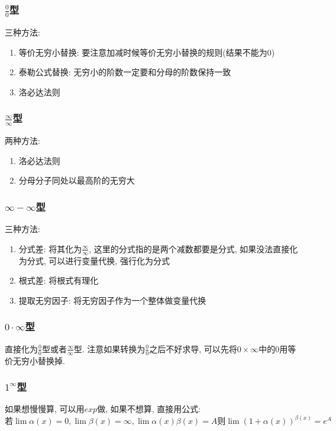 \subsubsection{$ \frac{0}{0} $型}
三种方法:
\begin{enumerate}
    \item 等价无穷小替换: 要注意加减时候等价无穷小替换的规则(结果不能为$ 0 $)
    \item 泰勒公式替换: 无穷小的阶数一定要和分母的阶数保持一致
    \item 洛必达法则
\end{enumerate}
\subsubsection{$ \frac{\infty}{\infty} $型}
两种方法:
\begin{enumerate}
    \item 洛必达法则
    \item 分母分子同处以最高阶的无穷大
\end{enumerate}
\subsubsection{$ \infty-\infty $型}
三种方法:
\begin{enumerate}
    \item 分式差: 将其化为$ \frac{\infty}{\infty} $, 这里的分式指的是两个减数都要是分式, 如果没法直接化为分式, 可以进行变量代换, 强行化为分式
    \item 根式差: 将根式有理化
    \item 提取无穷因子: 将无穷因子作为一个整体做变量代换
\end{enumerate}
\subsubsection{$ 0\cdot \infty $型}
直接化为$ \frac{0}{0} $型或者$ \frac{\infty}{\infty} $型. 注意如果转换为$ \frac{0}{0} $之后不好求导, 可以先将$ 0\times \infty $中的$ 0 $用等价无穷小替换掉.
\subsubsection{$ 1^{\infty} $型}
如果想慢慢算, 可以用$ exp $做, 如果不想算, 直接用公式:
\begin{equation*}
    \text{若}\lim\limits \alpha(x)=0, \lim\limits \beta(x)=\infty, \lim\limits \alpha(x)\beta(x)=A \text{则}\lim\limits (1+\alpha(x))^{\beta(x)}=e^{A}
\end{equation*}

